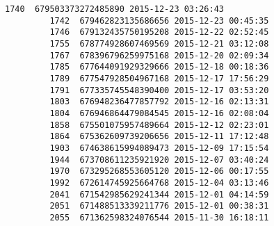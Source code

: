 \documentclass[11pt]{article}
\begin{document}
\begin{Verbatim}[commandchars=\\\{\}]
         1740  679503373272485890 2015-12-23 03:26:43   
         1742  679462823135686656 2015-12-23 00:45:35   
         1746  679132435750195208 2015-12-22 02:52:45   
         1755  678774928607469569 2015-12-21 03:12:08   
         1767  678396796259975168 2015-12-20 02:09:34   
         1785  677644091929329666 2015-12-18 00:18:36   
         1789  677547928504967168 2015-12-17 17:56:29   
         1791  677335745548390400 2015-12-17 03:53:20   
         1803  676948236477857792 2015-12-16 02:13:31   
         1804  676946864479084545 2015-12-16 02:08:04   
         1858  675501075957489664 2015-12-12 02:23:01   
         1864  675362609739206656 2015-12-11 17:12:48   
         1903  674638615994089473 2015-12-09 17:15:54   
         1944  673708611235921920 2015-12-07 03:40:24   
         1970  673295268553605120 2015-12-06 00:17:55   
         1992  672614745925664768 2015-12-04 03:13:46   
         2041  671542985629241344 2015-12-01 04:14:59   
         2051  671488513339211776 2015-12-01 00:38:31   
         2055  671362598324076544 2015-11-30 16:18:11   
         

\end{Verbatim}
\end{document}
